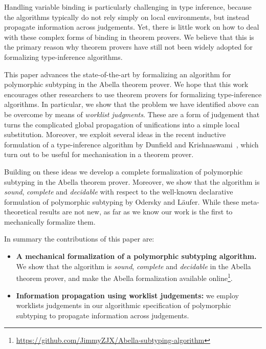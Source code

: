 Handling variable binding is particularly challenging in type inference,
because the algorithms typically do not rely simply on local environments, but
instead propagate information across judgements. Yet, there is little work on
how to deal with these complex forms of binding in theorem provers. We believe
that this is the primary reason why theorem provers have still not been widely
adopted for formalizing type-inference algorithms.

%

This paper advances the state-of-the-art by formalizing an algorithm for
polymorphic subtyping in the Abella theorem prover.  We hope that
this work encourages other researchers to use theorem provers for formalizing
type-inference algorithms.  
%
In particular, we show that the problem we have identified above can be
overcome by means of \emph{worklist judgments}. These are a form of
judgement that turns the complicated
global propagation of unifications into a simple local substitution.
Moreover, we exploit several ideas in the recent inductive
formulation of a type-inference algorithm by
Dunfield and Krishnaswami~\cite{dunfield2013complete}, which turn out to be useful
for mechanisation in a theorem prover.

Building on these ideas we develop a complete formalization of
polymorphic subtyping in the Abella theorem prover. Moreover, we
 show that the algorithm is \emph{sound}, \emph{complete} and \emph{decidable} with
respect to the well-known declarative formulation of polymorphic subtyping by
Odersky and L\"aufer.  While these meta-theoretical results are not new, as far
as we know our work is the first to mechanically formalize them.

In summary the contributions of this paper are:

\begin{itemize}
\item {\bf A mechanical formalization of a polymorphic subtyping
    algorithm.} We show that the algorithm is \emph{sound},
  \emph{complete} and \emph{decidable} in the Abella theorem prover,
  and make the Abella formalization available online\footnote{\url{https://github.com/JimmyZJX/Abella-subtyping-algorithm}}.

\item {\bf Information propagation using worklist judgements:} we
  employ worklists judgements in our algorithmic specification of polymorphic subtyping
  to propagate information across judgements.

\end{itemize}
